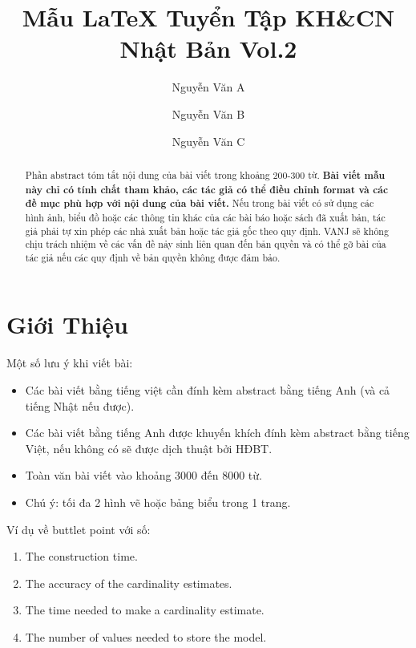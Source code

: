 \documentclass[runningheads]{llncs}
\begin{document}
\title{Mẫu LaTeX Tuyển Tập KH\&CN Nhật Bản Vol.2}
%
\author{Nguyễn Văn A \and
Nguyễn Văn B \and
Nguyễn Văn C}
%
%
\maketitle

\begin{abstract}
Phần abstract tóm tắt nội dung của bài viết trong khoảng 200-300 từ. \textbf{Bài viết mẫu này chỉ có tính chất tham khảo, các tác giả có thể điều chỉnh format và các đề mục phù hợp với nội dung của bài viết.} Nếu trong bài viết có sử dụng các hình ảnh, biểu đồ hoặc các thông tin khác của các bài báo hoặc sách đã xuất bản, tác giả phải tự xin phép các nhà xuất bản hoặc tác giả gốc theo quy định. VANJ sẽ không chịu trách nhiệm về các vấn đề nảy sinh liên quan đến bản quyền và có thể gỡ bài của tác giả nếu các quy định về bản quyền không được đảm bảo.

\end{abstract}

\section{Giới Thiệu}
Một số lưu ý khi viết bài:
\begin{itemize}
    \item Các bài viết bằng tiếng việt cần đính kèm abstract bằng tiếng Anh (và cả tiếng Nhật nếu được).
    \item Các bài viết bằng tiếng Anh được khuyến khích đính kèm abstract bằng tiếng Việt, nếu không có sẽ được dịch thuật bởi HĐBT.
    \item Toàn văn bài viết vào khoảng 3000 đến 8000 từ.
    \item Chú ý: tối đa 2 hình vẽ hoặc bảng biểu trong 1 trang.
\end{itemize}

Ví dụ về buttlet point với số:
\begin{enumerate}
    \item The construction time.
    \item The accuracy of the cardinality estimates.
    \item The time needed to make a cardinality estimate.
    \item The number of values needed to store the model.
\end{enumerate}
\end{document}
